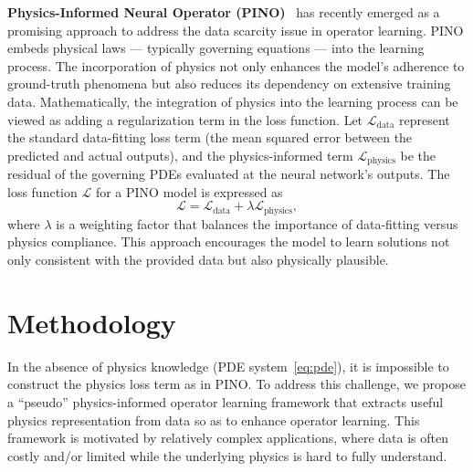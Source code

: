 \textbf{Physics-Informed Neural Operator (PINO)}~\citep{wang2021learning,li2021physics}  has recently emerged as a promising approach to address the data scarcity issue in operator learning.
PINO embeds physical laws --- typically governing equations --- into the learning process. The incorporation of physics not only enhances the model's adherence to ground-truth phenomena but also reduces its dependency on extensive training data. 
Mathematically, the integration of physics into the learning process can be viewed as adding a regularization term in the loss function. Let \(\mathcal{L}_\text{data}\) represent the standard data-fitting loss term (\eg the mean squared error between the predicted and actual outputs), and the physics-informed term \(\mathcal{L}_\text{physics}\) be the residual of the governing PDEs evaluated at the neural network's outputs. The loss function \(\mathcal{L}\) for a PINO model is expressed as
\[ \mathcal{L} = \mathcal{L}_\text{data} + \lambda \mathcal{L}_\text{physics}, \]
where \(\lambda\) is a weighting factor that balances the importance of data-fitting versus physics compliance. This approach encourages the model to learn solutions not only consistent with the provided data but also physically plausible.



\section{Methodology}
In the absence of physics knowledge (\ie PDE system~\eqref{eq:pde}), %
it is impossible to construct the physics loss term as in PINO.
To address this challenge, we propose a ``pseudo'' physics-informed operator learning framework that extracts useful physics representation from data so as to enhance operator learning. 
This framework is motivated by relatively complex applications, where data is often costly and/or limited while the underlying physics is hard to fully understand. %

